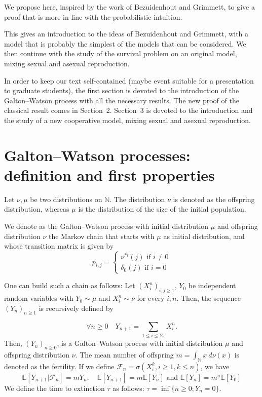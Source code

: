 \documentclass[svgnames]{amsart}
\newcommand{\N}{\ensuremath{\mathbb{N}}}
\newcommand{\E}{\ensuremath{\mathbb{E}}}
\newcommand{\1}{\mathbbo{1}}
\begin{document}
We propose here, inspired by the work of Bezuidenhout and Grimmett, to give a proof that is more in line  with the probabilistic intuition.

This gives an introduction to the ideas of Bezuidenhout and Grimmett, with a model that is probably the simplest of the models that can be considered.
We then continue with the study of the survival problem on an original model, mixing sexual and asexual reproduction.



In order to keep our text self-contained (maybe event suitable for a presentation to graduate students), the first section is devoted to the introduction of the Galton--Watson process with all the necessary results.
The new proof of the classical result comes in Section~2.
Section~3 is devoted to the introduction and the study of a new cooperative model, mixing sexual and asexual reproduction.
\section{Galton--Watson processes: definition and first properties}


Let $\nu,\mu$ be two distributions on $\N$.
The distribution $\nu$ is denoted as the offspring distribution, whereas $\mu$ 
is the distribution of the size of the initial population. 

We denote as  the 
Galton--Watson process with initial distribution $\mu$ and offspring distribution $\nu$
the Markov chain that starts with  $\mu$ as initial distribution, and whose transition matrix is given by
\begin{equation*}
p_{i,j}=
\begin{cases}
\nu^{*i}(j)\text{ if }i\ne 0\\
\delta_0(j)\text{ if }i=0
\end{cases}
\end{equation*}

One can build such a chain as follows:
Let $(X_i^n)_{i,j\ge 1}$, $Y_0$ be independent random variables with $Y_0\sim\mu$ and $X_i^n\sim\nu$ for every $i,n$.
Then, the sequence $(Y_n)_{n\ge 1}$ is recursively defined by

$$\forall n\ge 0\quad Y_{n+1}=\sum_{1\le i\le Y_n}X_i^n.$$
Then, $(Y_n)_{n\ge 0}$, is a Galton--Watson process with initial distribution $\mu$ and offspring distribution $\nu$.
The mean number of offspring  $m=\int_{\N} x\ d\nu(x)$ is denoted as the fertility.
If we define  $\mathcal{F}_n=\sigma(X_i^k,i\ge 1,k\le n)$, we have %
\begin{equation}
\label{puissance}
\E[Y_{n+1}|\mathcal{F}_n]=mY_n,\quad \E[Y_{n+1}]=m\E[Y_n]\text{ and }\E[Y_n]=m^n\E[Y_0]
\end{equation}
We define the time to extinction $\tau$ as follows: $\tau=\inf\{n\ge 0; Y_n=0\}$.
\end{document}
